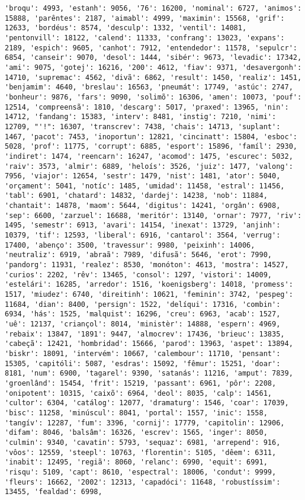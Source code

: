 \begin{Verbatim}[commandchars=\\\{\}]
'broqu': 4993, 'estanh': 9056, '76': 16200, 'nominal': 6727, 'animos': 15888, 'parêntes': 2187, 'aimabl': 4999, 'maximin': 15568, 'grif': 12633, 'bordéus': 8574, 'desculp': 1332, 'ventil': 14081, 'pentonvill': 18122, 'calend': 11333, 'confrang': 13023, 'expans': 2189, 'espich': 9605, 'canhot': 7912, 'entendedor': 11578, 'sepulcr': 6854, 'canseir': 9070, 'desol': 1444, 'sibér': 9673, 'levadic': 17342, 'ami': 9075, 'gotej': 16216, '200': 4612, 'fiav': 9371, 'desavergonh': 14710, 'supremac': 4562, 'divã': 6862, 'result': 1450, 'realiz': 1451, 'benjamim': 4640, 'breslau': 16563, 'pneumát': 17749, 'astúc': 2747, 'bonheur': 9876, 'fars': 9090, 'solimõ': 16306, 'amen': 10073, 'pouf': 12514, 'compreensã': 1810, 'descarg': 5017, 'praxed': 13965, 'nin': 14712, 'fandang': 15383, 'interv': 8481, 'instig': 7210, 'nimi': 12709, "'!": 16307, 'transcrev': 7438, 'chais': 14713, 'suplant': 1467, 'pacot': 7453, 'inoportun': 12821, 'cincinatt': 15804, 'esboc': 5028, 'prof': 11775, 'corrupt': 6885, 'esport': 15896, 'famíl': 2930, 'indiret': 1474, 'reencarn': 16247, 'acomod': 1475, 'escurec': 5032, 'raiv': 3573, 'almir': 6889, 'heloís': 3526, 'juiz': 1477, 'valong': 7956, 'viajor': 12654, 'sestr': 1479, 'nist': 1481, 'ator': 5040, 'orçament': 5041, 'notíc': 1485, 'umidad': 11458, 'estral': 11456, 'tabl': 6901, 'chatard': 14832, 'dardej': 14238, 'nob': 11884, 'chantait': 14878, 'maom': 5644, 'digitus': 14241, 'orgân': 6908, 'sep': 6600, 'zarzuel': 16688, 'meritór': 13140, 'ornar': 7977, 'riv': 1495, 'semestr': 6913, 'avari': 14154, 'inexat': 13729, 'anjinh': 10379, 'tif': 12593, 'liberal': 6916, 'cantarol': 3564, 'verrug': 17400, 'abenço': 3500, 'travessur': 9980, 'peixinh': 14006, 'neutraliz': 6919, 'abraã': 7989, 'difusã': 5646, 'erot': 7990, 'pandorg': 11931, 'realez': 8530, 'monóton': 4613, 'mostra': 14527, 'curios': 2202, 'rêv': 13465, 'consol': 1297, 'vistori': 14009, 'estelári': 16285, 'arredor': 1516, 'koenigsberg': 14018, 'promess': 1517, 'miudez': 6740, 'direitinh': 10621, 'feminin': 3742, 'pespeg': 11684, 'dian': 8400, 'persign': 1522, 'delíqui': 17316, 'combin': 6934, 'hás': 1525, 'malquist': 16296, 'creu': 6963, 'acab': 1527, 'uê': 12137, 'criançol': 8014, 'ministèr': 14888, 'espern': 4969, 'rebaix': 13847, '1891': 9447, 'almocrev': 17436, 'brieuc': 13835, 'cabeçã': 12421, 'hombridad': 15666, 'parod': 13963, 'aspet': 13894, 'biskr': 18091, 'intervém': 10667, 'calembour': 11710, 'pensant': 15305, 'capitóli': 5087, 'esdras': 15092, 'fêmur': 15251, 'doar': 8181, 'num': 6900, 'tagarel': 9390, 'satanás': 11216, 'amput': 7839, 'groenlând': 15454, 'frit': 15219, 'passant': 6961, 'pôr': 2208, 'onipotent': 10315, 'caixõ': 6964, 'deol': 8035, 'calp': 14561, 'cultor': 6304, 'catálog': 12077, 'dramaturg': 1546, 'coar': 17039, 'bisc': 11258, 'minúscul': 8041, 'portal': 1557, 'inic': 1558, 'tangív': 12287, 'fum': 3396, 'cornij': 17779, 'capitolin': 12906, 'difam': 8046, 'balsâm': 16326, 'escrev': 1565, 'inger': 8050, 'culmin': 9340, 'cavatin': 5793, 'sequaz': 6981, 'arrepend': 916, 'vôos': 12559, 'steepl': 10763, 'florentin': 5105, 'dêem': 6311, 'inabit': 12495, 'regiã': 8060, 'relanc': 6990, 'equit': 6991, 'risqu': 5109, 'capt': 8610, 'espectral': 18006, 'condut': 9999, 'fleurs': 16662, '2002': 12313, 'capadóci': 11648, 'robustíssim': 13455, 'fealdad': 6998, 
\end{Verbatim}
